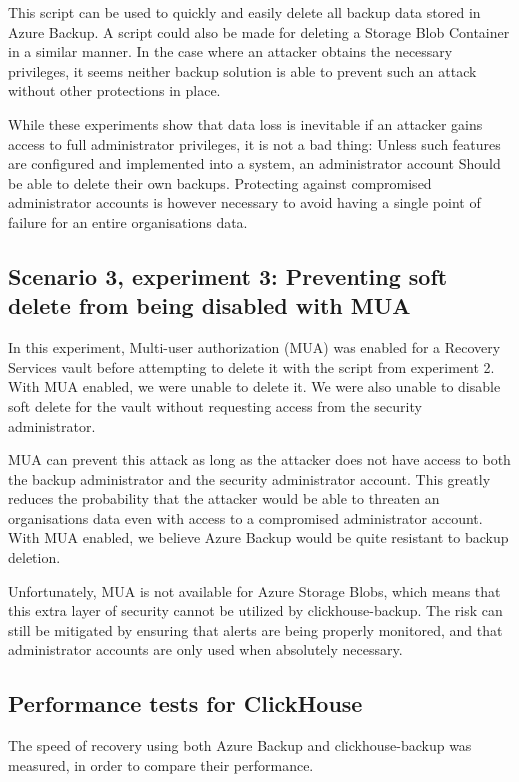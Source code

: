 This script can be used to quickly and easily delete all backup data stored in Azure Backup. A script could also be made for deleting a Storage Blob Container in a similar manner. In the case where an attacker obtains the necessary privileges, it seems neither backup solution is able to prevent such an attack without other protections in place. 

While these experiments show that data loss is inevitable if an attacker gains access to full administrator privileges, it is not a bad thing: Unless such features are configured and implemented into a system, an administrator account Should be able to delete their own backups. Protecting against compromised administrator accounts is however necessary to avoid having a single point of failure for an entire organisations data. 

\subsection{Scenario 3, experiment 3: Preventing soft delete from being disabled with MUA}

In this experiment, Multi-user authorization (MUA) was enabled for a Recovery Services vault before attempting to delete it with the script from experiment 2. With MUA enabled, we were unable to delete it. We were also unable to disable soft delete for the vault without requesting access from the security administrator. 

MUA can prevent this attack as long as the attacker does not have access to both the backup administrator and the security administrator account. This greatly reduces the probability that the attacker would be able to threaten an organisations data even with access to a compromised administrator account. With MUA enabled, we believe Azure Backup would be quite resistant to backup deletion.

Unfortunately, MUA is not available for Azure Storage Blobs, which means that this extra layer of security cannot be utilized by clickhouse-backup.
The risk can still be mitigated by ensuring that alerts are being properly monitored, and that administrator accounts are only used when absolutely necessary.

\subsection{Performance tests for ClickHouse}

The speed of recovery using both Azure Backup and clickhouse-backup was measured,
in order to compare their performance.

